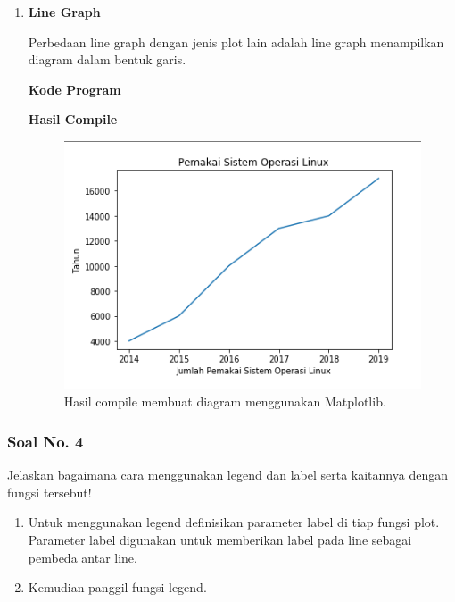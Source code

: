 \begin{enumerate}
	\item \textbf{Line Graph}
	
	Perbedaan line graph dengan jenis plot lain adalah line graph menampilkan diagram dalam bentuk garis.
	
	\textbf{Kode Program}
	
	
	
	\textbf{Hasil Compile}
	
	\begin{figure}[H]
		\includegraphics[width=12cm]{figures/6/1174089/Teori/line.png}
		\centering
		\caption{Hasil compile membuat diagram menggunakan Matplotlib.}
	\end{figure}
	
\end{enumerate}

\subsubsection{Soal No. 4}
\hfill \break
Jelaskan bagaimana cara menggunakan legend dan label serta kaitannya dengan fungsi tersebut!

\begin{enumerate}
	\item Untuk menggunakan legend definisikan parameter label di tiap fungsi plot. Parameter label digunakan untuk memberikan label pada line sebagai pembeda antar line.
	
	
	
	\item Kemudian panggil fungsi legend.
	
	
\end{enumerate}

